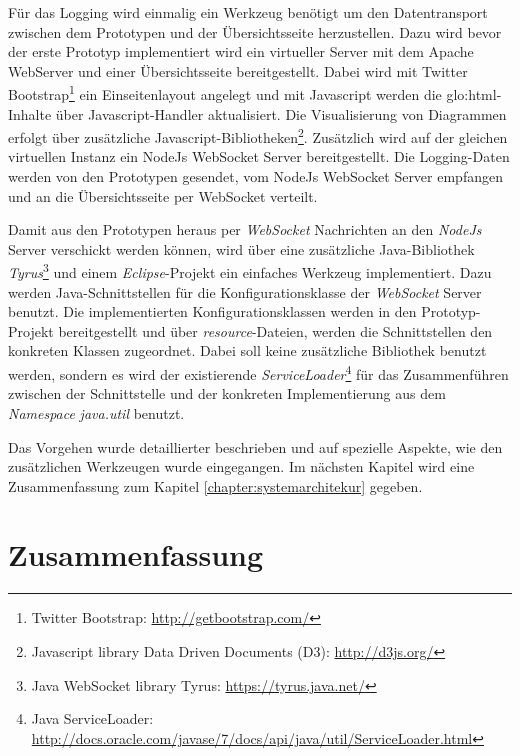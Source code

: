 Für das Logging wird einmalig ein Werkzeug benötigt um den Datentransport zwischen dem Prototypen und der Übersichtsseite herzustellen. Dazu wird bevor der erste Prototyp implementiert wird ein virtueller Server mit dem Apache WebServer und einer Übersichtsseite bereitgestellt. Dabei wird mit Twitter Bootstrap\footnote{Twitter Bootstrap: \url{http://getbootstrap.com/}} ein Einseitenlayout angelegt und mit Javascript werden die \gls{glo:html}-Inhalte über Javascript-Handler aktualisiert. Die Visualisierung von Diagrammen erfolgt über zusätzliche Javascript-Bibliotheken\footnote{Javascript library Data Driven Documents (D3): \url{http://d3js.org/}}. Zusätzlich wird auf der gleichen virtuellen Instanz ein NodeJs WebSocket Server bereitgestellt. Die Logging-Daten werden von den Prototypen gesendet, vom NodeJs WebSocket Server empfangen und an die Übersichtsseite per WebSocket verteilt.

Damit aus den Prototypen heraus per \textit{WebSocket} Nachrichten an den \textit{NodeJs} Server verschickt werden können, wird über eine zusätzliche Java-Bibliothek \textit{Tyrus}\footnote{Java WebSocket library Tyrus: \url{https://tyrus.java.net/}} und einem \textit{Eclipse}-Projekt ein einfaches Werkzeug implementiert. Dazu werden Java-Schnittstellen für die Konfigurationsklasse der \textit{WebSocket} Server benutzt. Die implementierten Konfigurationsklassen werden in den Prototyp-Projekt bereitgestellt und über \textit{resource}-Dateien, werden die Schnittstellen den konkreten Klassen zugeordnet. Dabei soll keine zusätzliche Bibliothek benutzt werden, sondern es wird der existierende \textit{ServiceLoader}\footnote{Java ServiceLoader: \url{http://docs.oracle.com/javase/7/docs/api/java/util/ServiceLoader.html}} für das Zusammenführen zwischen der Schnittstelle und der konkreten Implementierung aus dem \textit{Namespace} \textit{java.util} benutzt.

Das Vorgehen wurde detaillierter beschrieben und auf spezielle Aspekte, wie den zusätzlichen Werkzeugen wurde eingegangen. Im nächsten Kapitel wird eine Zusammenfassung zum Kapitel \ref{chapter:systemarchitekur} gegeben.


\section{Zusammenfassung}


